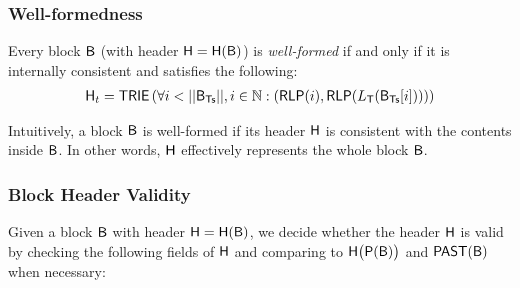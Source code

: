  
\subsubsection{Well-formedness}
\label{sec:internal consistency}
Every {\name} block $\textsf{B}$ (with header $\textsf{H}=\textsf{H}(\textsf{B})$) is \emph{well-formed} if and only if it is internally consistent and satisfies the following: 
\begin{align}
	\head_t = \trie\left(\forall i<||\block_{\txs}||, i\in \N: \left(\rlp(i),\rlp(L_{\tx}(\block_{\txs}[i]))\right) \right)  
\end{align}

Intuitively, a block $\textsf{B}$ is well-formed if its header $\textsf{H}$ is consistent with the contents inside $\textsf{B}$.
In other words, $\textsf{H}$ effectively represents the whole block $\textsf{B}$.




\subsubsection{Block Header Validity}
\label{sec:valid header}

Given a block $\textsf{B}$ with header $\textsf{H}=\textsf{H}(\textsf{B})$, 
we decide whether the header $\textsf{H}$ is valid by 
checking the following fields of $\textsf{H}$
and comparing to $\textsf{H}\big(\mathsf{P}(\textsf{B})\big)$ and $\mathsf{PAST}(\textsf{B})$ when necessary:

